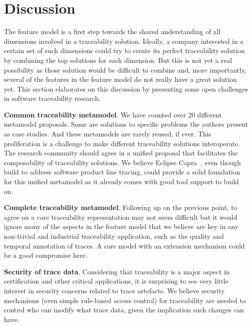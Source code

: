 \section{Discussion}\label{sec:discussion}

The feature model is a first step towards the shared understanding of all dimensions involved in a traceability solution. Ideally, a company interested in a certain set of such dimensions could try to create its perfect traceability solution by combining the top solutions for each dimension. But this is not yet a real possibility as those solution would be difficult to combine and, more importantly, several of the features in the feature model do not really have a great solution yet. This section elaborates on this discussion by presenting some open challenges in software traceability research.

\textbf{Common traceability metamodel}. We have counted over 20 different metamodel proposals. Some are solutions to specific problems the authors present as case studies. And these metamodels are rarely reused, if ever. This proliferation is a challenge to make different traceability solutions interoperate. The research community should agree in a unified proposal that facilitates the composability of traceability solutions. We believe Eclipse Capra~\cite{heisig2019-generic-traceability-metamodel-end-to-end-capra}, even though build to address software product line tracing, could provide a solid foundation for this unified metamodel as it already comes with good tool support to build on. 

\textbf{Complete traceability metamodel}. Following up on the previous point, to agree on a core traceability representation may not seem difficult but it would ignore many of the aspects in the feature model that we believe are key in any non-trivial and industrial traceability application, such as the quality and temporal annotation of traces. A core model with an extension mechanism could be a good compromise here.

\textbf{Security of trace data}. Considering that traceability is a major aspect in certification and other critical applications, it is surprising to see very little interest in security concerns related to trace artefacts. We believe security mechanisms (even simple rule-based access control) for traceability are needed to control who can modify what trace data, given the implication such changes can have. 

